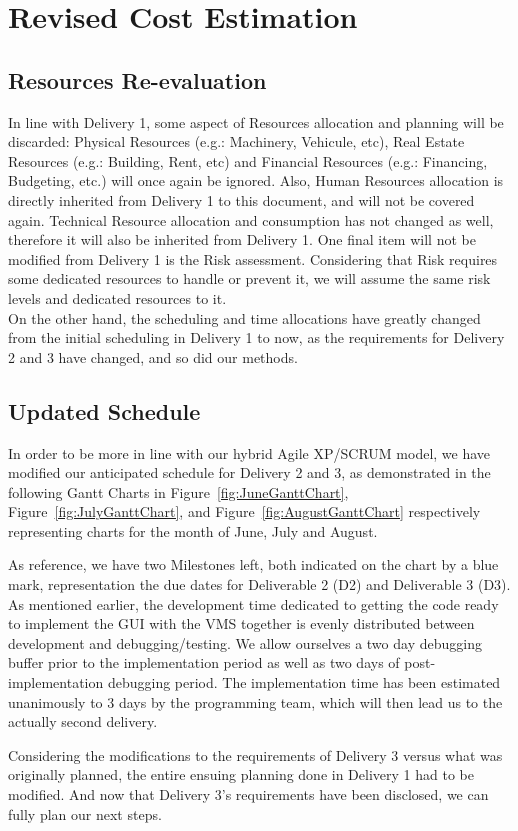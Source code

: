 \documentclass[12pt]{article}
\begin{document}
\section{Revised Cost Estimation}
\subsection{Resources Re-evaluation}
In line with Delivery 1, some aspect of Resources allocation and planning will be discarded: Physical Resources (e.g.: Machinery, Vehicule, etc), Real Estate Resources (e.g.: Building, Rent, etc) and Financial Resources (e.g.: Financing, Budgeting, etc.) will once again be ignored. Also, Human Resources allocation is directly inherited from Delivery 1 to this document, and will not be covered again. Technical Resource allocation and consumption has not changed as well, therefore it will also be inherited from Delivery 1. One final item will not be modified from Delivery 1 is the Risk assessment. Considering that Risk requires some dedicated resources to handle or prevent it, we will assume the same risk levels and dedicated resources to it.
\\
On the other hand, the scheduling and time allocations have greatly changed from the initial scheduling in Delivery 1 to now, as the requirements for Delivery 2 and 3 have changed, and so did our methods.


\subsection{Updated Schedule}
In order to be more in line with our hybrid Agile XP/SCRUM model, we have modified our anticipated schedule for Delivery 2 and 3, as demonstrated in the following Gantt Charts in Figure~\ref{fig:JuneGanttChart}, Figure~\ref{fig:JulyGanttChart}, and Figure~\ref{fig:AugustGanttChart} respectively representing charts for the month of June, July and August.
\par
As reference, we have two Milestones left, both indicated on the chart by a blue mark, representation the due dates for Deliverable 2 (D2) and Deliverable 3 (D3). As mentioned earlier, the development time dedicated to getting the code ready to implement the GUI with the VMS together is evenly distributed between development and debugging/testing.  We allow ourselves a two day debugging buffer prior to the implementation period as well as two days of post-implementation debugging period. The implementation time has been estimated unanimously to 3 days by the programming team, which will then lead us to the actually second delivery.\par
	Considering the modifications to the requirements of Delivery 3 versus what was originally planned, the entire ensuing planning done in Delivery 1 had to be modified. And now that Delivery 3’s requirements have been disclosed, we can fully plan our next steps.\par
\end{document}
